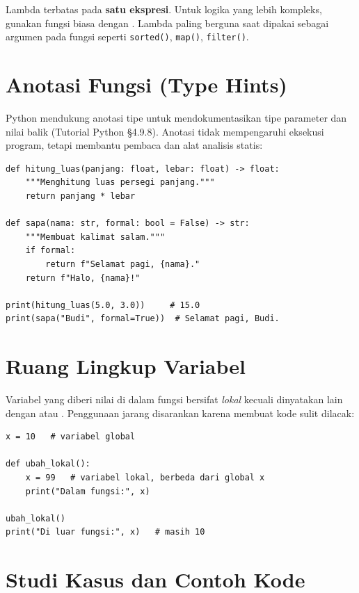 ﻿\documentclass[../main.tex]{subfiles}
\begin{document}
\begin{konsep}
Lambda terbatas pada \textbf{satu ekspresi}. Untuk logika yang lebih kompleks, gunakan fungsi biasa dengan . Lambda paling berguna saat dipakai sebagai argumen pada fungsi seperti \texttt{sorted()}, \texttt{map()}, \texttt{filter()}.
\end{konsep}

\section{Anotasi Fungsi (Type Hints)}

Python mendukung anotasi tipe untuk mendokumentasikan tipe parameter dan nilai balik (Tutorial Python §4.9.8). Anotasi tidak mempengaruhi eksekusi program, tetapi membantu pembaca dan alat analisis statis:

\begin{lstlisting}[caption=Anotasi fungsi / type hints]
def hitung_luas(panjang: float, lebar: float) -> float:
    """Menghitung luas persegi panjang."""
    return panjang * lebar

def sapa(nama: str, formal: bool = False) -> str:
    """Membuat kalimat salam."""
    if formal:
        return f"Selamat pagi, {nama}."
    return f"Halo, {nama}!"

print(hitung_luas(5.0, 3.0))     # 15.0
print(sapa("Budi", formal=True))  # Selamat pagi, Budi.
\end{lstlisting}

\section{Ruang Lingkup Variabel}

Variabel yang diberi nilai di dalam fungsi bersifat \textit{lokal} kecuali dinyatakan lain dengan  atau . Penggunaan  jarang disarankan karena membuat kode sulit dilacak:

\begin{lstlisting}[caption=Ruang lingkup lokal]
x = 10   # variabel global

def ubah_lokal():
    x = 99   # variabel lokal, berbeda dari global x
    print("Dalam fungsi:", x)

ubah_lokal()
print("Di luar fungsi:", x)   # masih 10
\end{lstlisting}

\section{Studi Kasus dan Contoh Kode}
\end{document}

